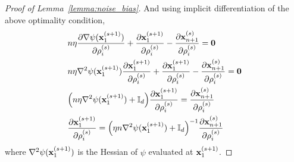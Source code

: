 \begin{proof}[Proof of Lemma~\ref{lemma:noise_bias}]
    And using implicit differentiation of the above optimality condition, 
    \begin{align}
        &n \eta \frac{\partial \nabla \psi({\mathbf{x}}_1^{(s+1)})}{\partial \rho_i^{(s)}}
        + \frac{\partial {\mathbf{x}}_1^{(s+1)}}{\partial \rho_i^{(s)}}
        - \frac{\partial {\mathbf{x}}_{n+1}^{(s)}}{\partial \rho_i^{(s)}} = \mathbf{0}\\
        &n \eta \nabla^2\psi({\mathbf{x}}_1^{(s+1)})\frac{\partial {\mathbf{x}}_1^{(s+1)}}{\partial \rho_i^{(s)}} + \frac{\partial {\mathbf{x}}_1^{(s+1)}}{\partial \rho_i^{(s)}} - \frac{\partial {\mathbf{x}}_{n+1}^{(s)}}{\partial \rho_i^{(s)}} = \mathbf{0}\\
        &\Big( n \eta \nabla^2 \psi({\mathbf{x}}_1^{(s+1)}) + {\mathbb{I}}_d \Big) \frac{\partial {\mathbf{x}}_1^{(s+1)}}{\partial \rho_i^{(s)}}
        = \frac{\partial {\mathbf{x}}_{n+1}^{(s)}}{\partial \rho_i^{(s)}}\\
    \label{eq:diff_implicit}
        &\frac{\partial {\mathbf{x}}_{1}^{(s+1)}}{\partial \rho_i^{(s)}} = \Big(\eta n \nabla^2 \psi({\mathbf{x}}_1^{(s+1)}) + {\mathbb{I}}_d \Big)^{-1} \frac{\partial {\mathbf{x}}_{n+1}^{(s)}}{\partial \rho_i^{(s)}}
    \end{align}
    where $\nabla^2 \psi({\mathbf{x}}_1^{(s+1)})$ is the Hessian of $\psi$ evaluated at ${\mathbf{x}}_1^{(s+1)}$.


\end{proof}
